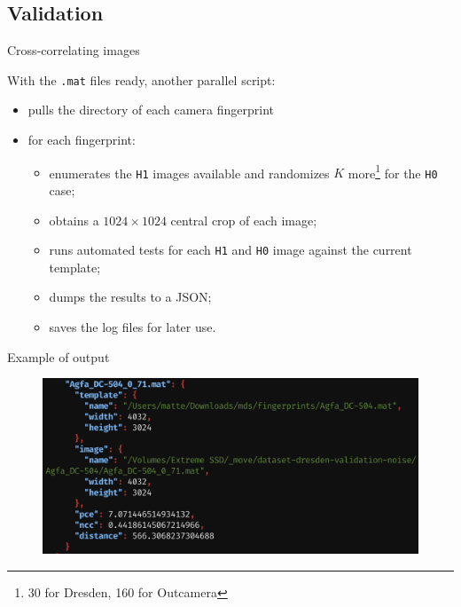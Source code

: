 \subsection{Validation}

\begin{frame}{Cross-correlating images}

    With the \texttt{.mat} files ready, another parallel script:
    
    \begin{itemize}
        \item<2-> pulls the directory of each camera fingerprint
        \item<3-> for each fingerprint: \begin{itemize}
            \item enumerates the \texttt{H1} images available and randomizes $K$ more\footnote{30 for Dresden, 160 for Outcamera} for the \texttt{H0} case;
            \item obtains a $1024 \times 1024$ central crop of each image;
            \item runs automated tests for each \texttt{H1} and \texttt{H0} image against the current template;
            \item dumps the results to a JSON;
            \item saves the log files for later use.
        \end{itemize}
    \end{itemize}
    
\end{frame}

\begin{frame}{Example of output}

    \begin{figure}
        \centering
        \includegraphics[width=\textwidth]{../drawable/examples/example-output.png}
    \end{figure}
    
\end{frame}

